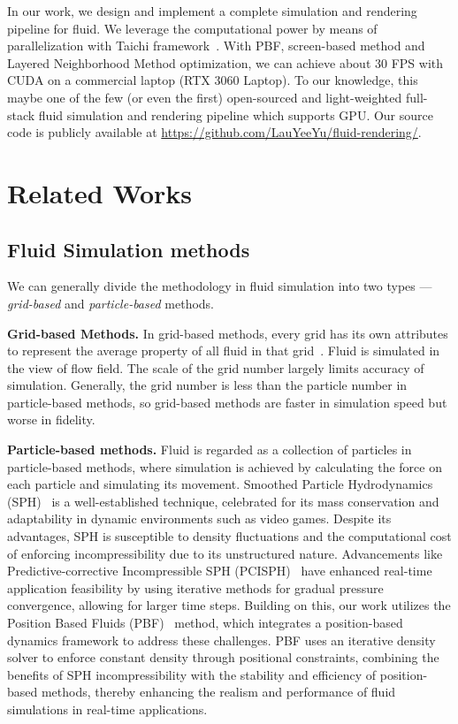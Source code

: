 \documentclass[sigconf]{acmart}
\begin{document}
In our work, we design and implement a complete simulation and rendering pipeline for fluid. We leverage the computational power by means of parallelization with Taichi framework~\cite{hu2019taichi, hu2019difftaichi, hu2021quantaichi}. With PBF, screen-based method and Layered Neighborhood Method optimization, we can achieve about 30 FPS with CUDA on a commercial laptop (RTX 3060 Laptop). To our knowledge, this maybe one of the few (or even the first) open-sourced and light-weighted full-stack fluid simulation and rendering pipeline which supports GPU. Our source code is publicly available at \url{https://github.com/LauYeeYu/fluid-rendering/}.

\section{Related Works}
\subsection{Fluid Simulation methods}
We can generally divide the methodology in fluid simulation into two types --- \textit{grid-based} and \textit{particle-based} methods.

\textbf{Grid-based Methods.} In grid-based methods, every grid has its own attributes to represent the average property of all fluid in that grid~\cite{harlow1965numerical, foster2001practical}. Fluid is simulated in the view of flow field. The scale of the grid number largely limits accuracy of simulation. Generally, the grid number is less than the particle number in particle-based methods, so grid-based methods are faster in simulation speed but worse in fidelity.

\textbf{Particle-based methods.} Fluid is regarded as a collection of particles in particle-based methods, where simulation is achieved by calculating the force on each particle and simulating its movement. Smoothed Particle Hydrodynamics (SPH)~\cite{monaghan1992smoothed} is a well-established technique, celebrated for its mass conservation and adaptability in dynamic environments such as video games. Despite its advantages, SPH is susceptible to density fluctuations and the computational cost of enforcing incompressibility due to its unstructured nature. Advancements like Predictive-corrective Incompressible SPH (PCISPH)~\cite{solenthaler2009predictive} have enhanced real-time application feasibility by using iterative methods for gradual pressure convergence, allowing for larger time steps. Building on this, our work utilizes the Position Based Fluids (PBF)~\cite{macklin2013position} method, which integrates a position-based dynamics framework to address these challenges. PBF uses an iterative density solver to enforce constant density through positional constraints, combining the benefits of SPH incompressibility with the stability and efficiency of position-based methods, thereby enhancing the realism and performance of fluid simulations in real-time applications.
\end{document}
